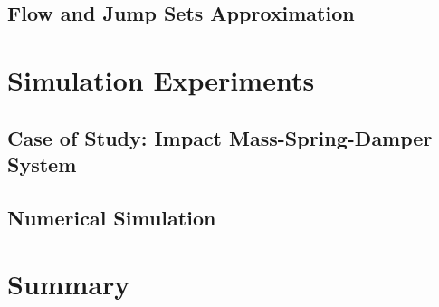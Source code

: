 \subsection{Flow and Jump Sets Approximation}


\section{Simulation Experiments}\label{Experiments}
\subsection{Case of Study: Impact Mass-Spring-Damper System}
\subsection{Numerical Simulation}

\section{Summary}\label{conc}
%
